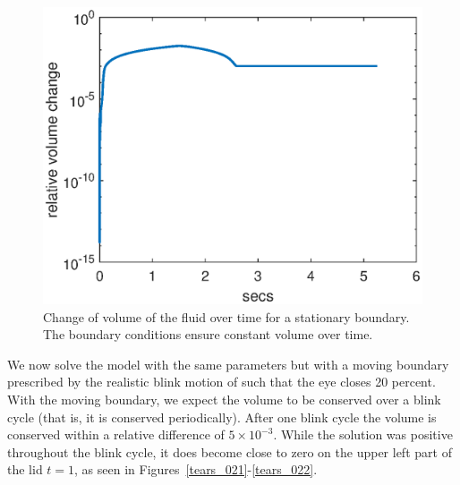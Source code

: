 \begin{figure}
	\centering
	\includegraphics[scale=0.8]{Chapter4/stationary_volume_change}
	\caption{Change of volume of the fluid over time for a stationary boundary. The boundary conditions ensure constant volume over time.}
	\label{eye_volume}
\end{figure}

We now solve the model with the same parameters but with a moving boundary prescribed by the realistic blink motion of \cite{deng2014heat} such that the eye closes 20 percent. With the moving boundary, we expect the volume to be conserved over a blink cycle (that is, it is conserved periodically). After one blink cycle the volume is conserved within a relative difference of $5 \times 10^{-3}$. While the solution was positive throughout the blink cycle, it does become close to zero on the upper left part of the lid $t=1$, as seen in Figures~\ref{tears_021}-\ref{tears_022}.


%	

